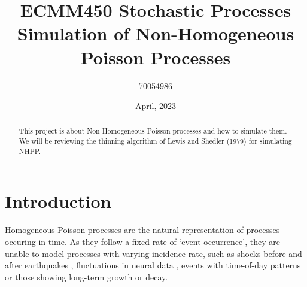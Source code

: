 \documentclass[%
 reprint,
 amsmath,amssymb,
 aps,
]{revtex4-2}
\theoremstyle{definition}
\begin{document}

\title{ECMM450 Stochastic Processes\\Simulation of Non-Homogeneous Poisson Processes}%

\author{70054986}


\date{April, 2023}%

\begin{abstract}
This project is about Non-Homogeneous Poisson processes and how to simulate them. We will be reviewing the thinning algorithm of Lewis and Shedler (1979) for simulating NHPP.

\end{abstract}

\maketitle

\section{\label{sec:level1}Introduction}

Homogeneous Poisson processes are the natural representation of processes occuring in time. As they follow a fixed rate of `event occurrence', they are unable to model processes with varying incidence rate, such as shocks before and after earthquakes \cite{vere-jones_1970}, fluctuations in neural data \cite{gabbiani_cox_2010}, events with time-of-day patterns or those showing long-term growth or decay.
\end{document}
